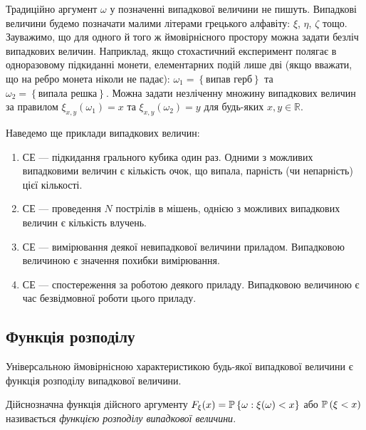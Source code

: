Традиційно аргумент $\omega$ у позначенні випадкової величини не пишуть.
Випадкові величини будемо позначати малими літерами грецького алфавіту: $\xi$, $\eta$, $\zeta$ тощо.
Зауважимо, що для одного й того ж ймовірнісного простору можна задати безліч випадкових величин.
Наприклад, якщо стохастичний експеримент полягає в одноразовому підкиданні монети, елементарних подій лише дві
(якщо вважати, що на ребро монета ніколи не падає):
$\omega_1 = \left\{\text{випав герб}\right\}$ та $\omega_2 = \left\{\text{випала решка} \right\}$.
Можна задати незліченну множину випадкових величин за правилом $\xi_{x, y}(\omega_1) = x$ та
$\xi_{x, y}(\omega_2) = y$ для будь-яких $x, y\in\mathbb{R}$.

\begin{example}
    Наведемо ще приклади випадкових величин:
    \begin{enumerate}
        \item СЕ --- підкидання грального кубика один раз. Одними з можливих випадковими величин
        є кількість очок, що випала, парність (чи непарність) цієї кількості.
        \item СЕ --- проведення $N$ пострілів в мішень, однією з можливих випадкових величин є кількість влучень.
        \item СЕ --- вимірювання деякої невипадкової величини приладом. Випадковою величиною є значення похибки вимірювання.
        \item СЕ --- спостереження за роботою деякого приладу. Випадковою величиною є час безвідмовної роботи цього приладу.
    \end{enumerate}
\end{example}


\subsection{Функція розподілу}

Універсальною ймовірнісною характеристикою будь-якої випадкової величини є функція 
розподілу випадкової величини.

\begin{definition}
    Дійснозначна функція дійсного аргументу $ F_\xi (x) = 
    \P\left\{\omega:\xi(\omega) < x\right\}$ або 
    $\P\left(\xi < x\right)$ називається \emph{функцією розподілу випадкової величини}.
\end{definition}

